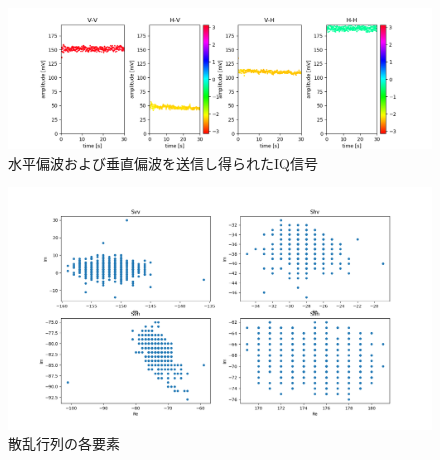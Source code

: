 \documentclass[uplatex,a4paper,12pt]{jsarticle}
\begin{document}
\begin{figure}[hbtp]
	\centering
	\includegraphics[scale=0.6]{../img/20220707_test_1_AmPh4_2Tx2Rx.png}
    \caption{水平偏波および垂直偏波を送信し得られたIQ信号}
	\label{fig:iq}
\end{figure}
\begin{figure}[hbtp]
	\centering
	\includegraphics[scale=0.4]{../img/20220707_test_1_IQ4_2Tx2Rx.png}
    \caption{散乱行列の各要素}
	\label{fig:scatter}
\end{figure}
\end{document}
